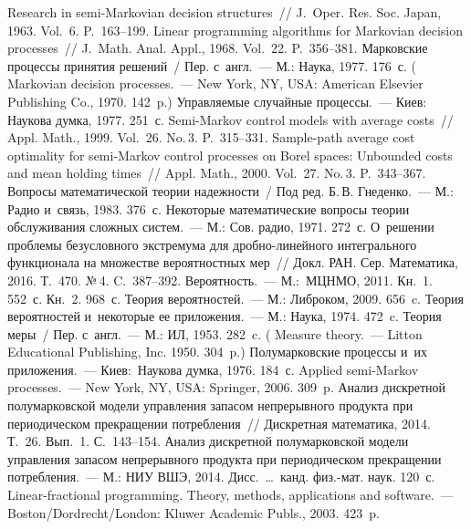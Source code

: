 \begin{multicols}{2}
{{\begin{thebibliography}{99}
 Research in semi-Markovian decision structures~// 
J.~Oper. Res. Soc. Japan, 1963. Vol.~6. P.~163--199.
 Linear programming algorithms for Markovian decision processes~//
 J.~Math. Anal. Appl., 1968. Vol.~22. P.~356--381.
 Марковские процессы принятия решений~/ Пер. с~англ.~--- 
М.: Наука, 1977. 176~с.
( 
Markovian decision processes.~--- New York, NY, USA: 
American Elsevier Publishing Co., 1970. 142~p.)
 Управляемые случайные процессы.~--- 
Киев: Наукова думка, 1977. 251~с.
 Semi-Markov control models with average costs~// 
Appl. Math., 1999. Vol.~26. No.\,3. P.~315--331.
 Sample-path average cost optimality for 
semi-Markov control processes on Borel spaces: Unbounded costs and mean holding times~// 
Appl. Math., 2000. Vol.~27. No.\,3. P.~343--367.
Вопросы математической теории надежности~/ Под ред. Б.\,В. Гнеденко.~--- 
М.: Радио и~связь, 1983. 376~с.
 Некоторые математические вопросы теории 
обслуживания сложных систем.~---  М.: Сов. радио, 1971. 272~с.
 О~решении проблемы безусловного экстремума для 
дроб\-но-ли\-ней\-но\-го интегрального функционала на множестве вероятностных мер~// 
Докл. РАН. Сер. Математика, 2016. Т.~470. №\,4. C.~387--392.
  Вероятность.~--- М.:~МЦНМО, 2011. Кн.~1. 552~с. Кн.~2. 968~с.
 Теория вероятностей.~--- М.: Либроком, 2009. 656~c.
 Теория вероятностей 
и~некоторые ее приложения.~--- М.: Наука, 1974. 472~c.
 Теория меры~/ Пер. с~англ.~--- М.: ИЛ, 1953. 282~c.
( Measure theory.~--- Litton Educational Publishing, Inc. 1950. 304~p.)
 Полумарковские процессы и~их приложения.~--- 
Киев:~Наукова думка, 1976. 184~с.
 Applied semi-Markov processes.~--- New York,
NY, USA: Springer, 2006. 309~p.
 Анализ дискретной полумарковской модели
 управления запасом непрерывного продукта при периодическом прекращении потребления~// 
 Дискретная математика, 2014. Т.~26. Вып.~1. С.~143--154.
 Анализ дискретной полумарковской модели
 управления запасом непрерывного продукта при периодическом прекращении 
 потребления.~--- М.: НИУ ВШЭ, 2014.  Дисс.\ \ldots\ канд. физ.-мат. наук. 120~с.
 Linear-fractional programming. 
Theory, methods, applications and software.~--- 
Boston/\linebreak Dordrecht/London: Kluwer Academic Publs., 2003. 423~p.


\end{thebibliography}}}
\end{multicols}
